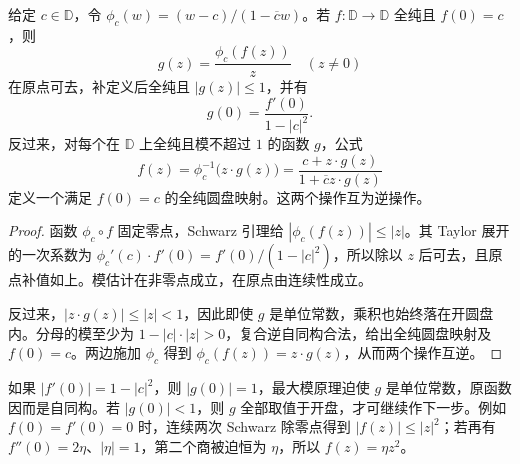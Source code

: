 \begin{proposition}[Schur 步骤]\label{b3:prop:06-schur-step}
给定 \(c\in\mathbb D\)，令 \(\phi_c(w)=(w-c)/(1-\overline c w)\)。若 \(f:\mathbb D\rightarrow\mathbb D\) 全纯且 \(f(0)=c\)，则
\[
 g(z)=\frac{\phi_c(f(z))}{z}\quad(z\ne0)
\]
在原点可去，补定义后全纯且 \(|g(z)|\le1\)，并有
\[
 g(0)=\frac{f'(0)}{1-|c|^2}.
\]
反过来，对每个在 \(\mathbb D\) 上全纯且模不超过 \(1\) 的函数 \(g\)，公式
\[
 f(z)=\phi_c^{-1}\bigl(z\cdot g(z)\bigr)
     =\frac{c+z\cdot g(z)}{1+\overline c z\cdot g(z)}
\]
定义一个满足 \(f(0)=c\) 的全纯圆盘映射。这两个操作互为逆操作。
\end{proposition}
\begin{proof}
函数 \(\phi_c\circ f\) 固定零点，Schwarz 引理给 \(|\phi_c(f(z))|\le|z|\)。其 Taylor 展开的一次系数为 \(\phi_c'(c)\cdot f'(0)=f'(0)/(1-|c|^2)\)，所以除以 \(z\) 后可去，且原点补值如上。模估计在非零点成立，在原点由连续性成立。

反过来，\(|z\cdot g(z)|\le|z|<1\)，因此即使 \(g\) 是单位常数，乘积也始终落在开圆盘内。分母的模至少为 \(1-|c|\cdot|z|>0\)，复合逆自同构合法，给出全纯圆盘映射及 \(f(0)=c\)。两边施加 \(\phi_c\) 得到 \(\phi_c(f(z))=z\cdot g(z)\)，从而两个操作互逆。
\end{proof}

如果 \(|f'(0)|=1-|c|^2\)，则 \(|g(0)|=1\)，最大模原理迫使 \(g\) 是单位常数，原函数因而是自同构。若 \(|g(0)|<1\)，则 \(g\) 全部取值于开盘，才可继续作下一步。例如 \(f(0)=f'(0)=0\) 时，连续两次 Schwarz 除零点得到 \(|f(z)|\le|z|^2\)；若再有 \(f''(0)=2\eta\)、\(|\eta|=1\)，第二个商被迫恒为 \(\eta\)，所以 \(f(z)=\eta z^2\)。

